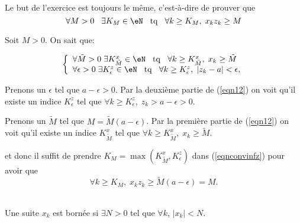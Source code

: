 \vspace{0.5cm}
\\

Le but de l'exercice est toujours le même, c'est-à-dire de prouver que
\begin{equation}		\label{eqnconvinfz}
  \forall M > 0 \hspace{0.3cm} \exists K_M \in \eN \hspace{0.3cm} {\rm tq} \hspace{0.3cm} \forall k \geq K_M, \;x_k  z_k \geq M
\end{equation}

\noindent Soit $M>0$. On sait  que:

\begin{equation}
\label{eqn12}\left\{\begin{array}{l}
        \forall \tilde{M} >0 \;\exists K^x_{\tilde{M}} \in \eN \hspace{0.3cm} {\rm tq} \hspace{0.3cm} \forall k \geq K^x_{\tilde{M}},\; x_k \geq  \tilde{M} \\
       \forall \epsilon >0\;\exists K^z_\epsilon \in \eN \hspace{0.3cm} {\rm tq} \hspace{0.3cm} \forall k \geq K^z_\epsilon,\; |z_k-a| <\epsilon,
\end{array}\right.\end{equation}

\noindent Prenons un $\epsilon$ tel que $a-\epsilon>0$. Par la deuxième partie de (\ref{eqn12}) on voit qu'il existe un indice $ K^z_\epsilon$ tel que $ \forall k \geq K^z_\epsilon,\; z_k > a-\epsilon >0$.

\noindent Prenons un $\tilde{M}$ tel que $M= \tilde{M}(a-\epsilon)$. Par la première partie de (\ref{eqn12}) on voit qu'il existe un indice $ K^x_{\tilde{M}} $ tel que $\forall k \geq K^x_{\tilde{M}},\; x_k \geq  \tilde{M} $.


\noindent et donc il suffit  de prendre  $K_M = \max(K_{\tilde{M}}^x, K^z_\epsilon)$ dans (\ref{eqnconvinfz}) pour avoir que
\[ \forall k \geq K_M, \;x_k  z_k \geq \tilde{M}(a-\epsilon)=M.\]


\\

\noindent Une suite $x_k$ est bornée si $\exists N>0$ tel que $\forall k$, $|x_k| < N$.

